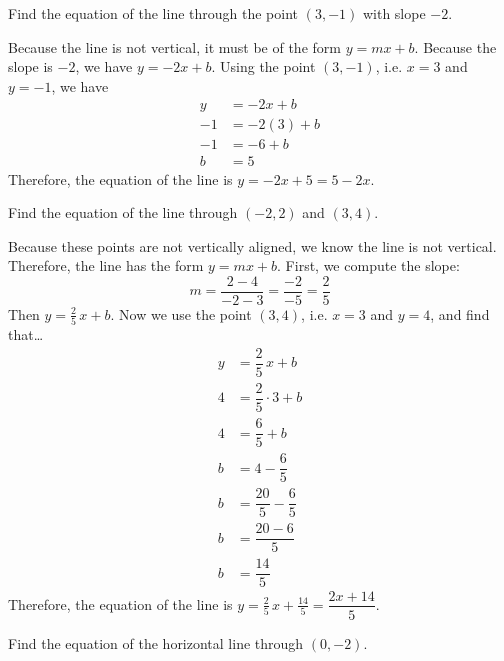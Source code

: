 \documentclass[11pt,letterpaper]{article}
\begin{document}


 Find the equation of the line through the point $(3, -1)$ with slope $-2$. \pspace

\sol Because the line is not vertical, it must be of the form $y= mx + b$. Because the slope is $-2$, we have $y= -2x + b$. Using the point $(3, -1)$, i.e. $x= 3$ and $y= -1$, we have
	\[
	\begin{aligned}
	y&= -2x + b \\
	-1&= -2(3) + b \\
	-1&= -6 + b \\
	b&= 5
	\end{aligned}
	\]
Therefore, the equation of the line is $y= -2x + 5= 5 - 2x$. 





\newpage





 Find the equation of the line through $(-2, 2)$ and $(3, 4)$. \pspace

\sol Because these points are not vertically aligned, we know the line is not vertical. Therefore, the line has the form $y= mx + b$. First, we compute the slope:
	\[
	m= \dfrac{2 - 4}{-2 - 3}= \dfrac{-2}{-5}= \dfrac{2}{5}
	\]
Then $y= \frac{2}{5}\,x + b$. Now we use the point $(3, 4)$, i.e. $x= 3$ and $y= 4$, and find that\dots
	\[
	\begin{aligned}
	y&= \dfrac{2}{5}\,x + b \\
	4&= \dfrac{2}{5} \cdot 3 + b \\
	4&= \dfrac{6}{5} + b \\
	b&= 4 - \dfrac{6}{5} \\
	b&= \dfrac{20}{5} - \dfrac{6}{5} \\
	b&= \dfrac{20 - 6}{5} \\
	b&= \dfrac{14}{5}
	\end{aligned}
	\]
Therefore, the equation of the line is $y= \frac{2}{5}\,x + \frac{14}{5}= \dfrac{2x + 14}{5}$. 





\newpage





 Find the equation of the horizontal line through $(0, -2)$. \pspace
\end{document}
